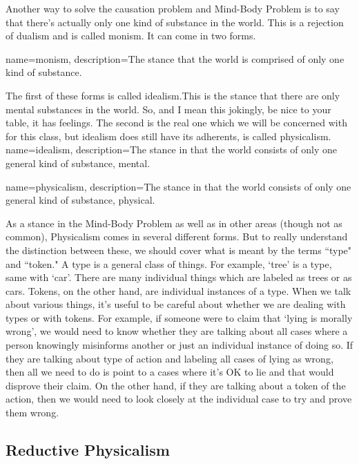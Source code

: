 Another way to solve the causation problem and Mind-Body Problem is to say that there’s actually only one kind of substance in the world. This is a rejection of dualism and is called \gls{monism}. It can come in two forms.

{
name=monism,
description={The stance that the world is comprised of only one kind of substance.}
}


The first of these forms is called \Gls{idealism}.This is the stance that there are only mental substances in the world. So, and I mean this jokingly, be nice to your table, it has feelings. The second is the real one which we will be concerned with for this class, but idealism does still have its adherents, is called \Gls{physicalism}. 
{
name=idealism,
description={The stance in that the world consists of only one general kind of substance, mental.}
}

{
name=physicalism,
description={The stance in that the world consists of only one general kind of substance, physical.}
}


As a stance in the Mind-Body Problem as well as in other areas (though not as common), Physicalism comes in several different forms. But to really understand the distinction between these, we should cover what is meant by the terms ``type" and ``token." A type is a general class of things. For example, `tree' is a type, same with `car'. There are many individual things which are labeled as trees or as cars. Tokens, on the other hand, are individual instances of a type. When we talk about various things, it's useful to be careful about whether we are dealing with types or with tokens. For example, if someone were to claim that `lying is morally wrong', we would need to know whether they are talking about all cases where a person knowingly misinforms another or just an individual instance of doing so. If they are talking about type of action and labeling all cases of lying as wrong, then all we need to do is point to a cases where it's OK to lie and that would disprove their claim. On the other hand, if they are talking about a token of the action, then we would need to look closely at the individual case to try and prove them wrong.

\subsection{Reductive Physicalism}

